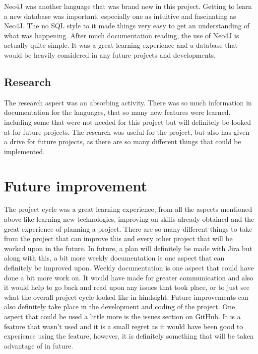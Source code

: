 Neo4J was another language that was brand new in this project. Getting to learn a new database was important, especially one as intuitive and fascinating as Neo4J. The no SQL style to it made things very easy to get an understanding of what was happening. After much documentation reading, the use of Neo4J is actually quite simple. It was a great learning experience and a database that would be heavily considered in any future projects and developments. \\

\subsection{Research}

The research aspect was an absorbing activity. There was so much information in documentation for the languages, that so many new features were learned, including some that were not needed for this project but will definitely be looked at for future projects. The research was useful for the project, but also has given a drive for future projects, as there are so many different things that could be implemented. \\

\section{Future improvement}

The project cycle was a great learning experience, from all the aspects mentioned above like learning new technologies, improving on skills already obtained and the great experience of planning a project. There are so many different things to take from the project that can improve this and every other project that will be worked upon in the future. In future, a plan will definitely be made with Jira but along with this, a bit more weekly documentation is one aspect that can definitely be improved upon. Weekly documentation is one aspect that could have done a bit more work on. It would have made for greater communication and also it would help to go back and read upon any issues that took place, or to just see what the overall project cycle looked like in hindsight. Future improvements can also definitely take place in the development and coding of the project. One aspect that could be used a little more is the issues section on GitHub. It is a feature that wasn’t used and it is a small regret as it would have been good to experience using the feature, however, it is definitely something that will be taken advantage of in future. \\

